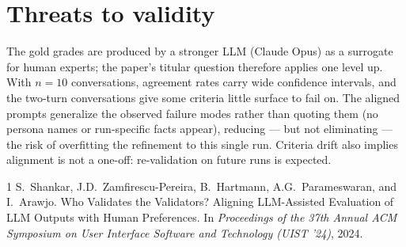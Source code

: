 \documentclass[11pt,a4paper]{article}
\begin{document}
\section{Threats to validity}

The gold grades are produced by a stronger LLM (Claude Opus) as a surrogate for
human experts; the paper's titular question therefore applies one level up.
With $n=10$ conversations, agreement rates carry wide confidence intervals, and
the two-turn conversations give some criteria little surface to fail on. The
aligned prompts generalize the observed failure modes rather than quoting them
(no persona names or run-specific facts appear), reducing --- but not
eliminating --- the risk of overfitting the refinement to this single run.
Criteria drift also implies alignment is not a one-off: re-validation on future
runs is expected.

\begin{thebibliography}{1}
S.~Shankar, J.D.~Zamfirescu-Pereira, B.~Hartmann, A.G.~Parameswaran, and
I.~Arawjo.
\newblock Who Validates the Validators? Aligning LLM-Assisted Evaluation of LLM
Outputs with Human Preferences.
\newblock In \emph{Proceedings of the 37th Annual ACM Symposium on User
Interface Software and Technology (UIST '24)}, 2024.
\end{thebibliography}
\end{document}
